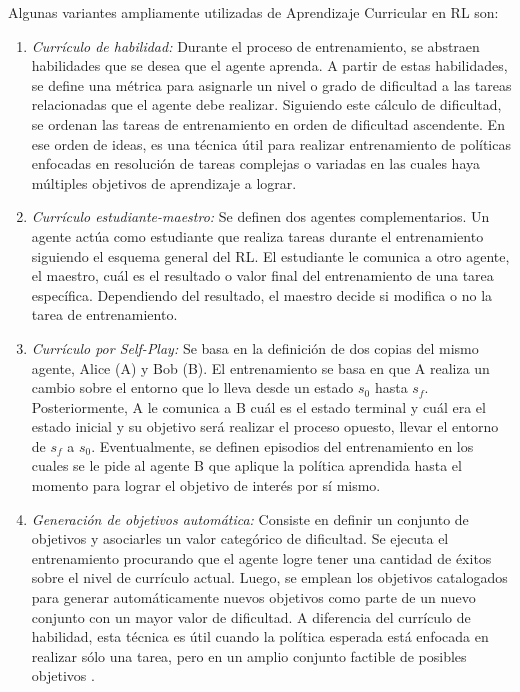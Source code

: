 Algunas variantes ampliamente utilizadas de Aprendizaje Curricular en RL son:

\begin{enumerate}
	\item \textit{Currículo de habilidad:} Durante el proceso de entrenamiento, se abstraen habilidades que se desea que el agente aprenda. A partir de estas habilidades, se define una métrica para asignarle un nivel o grado de dificultad a las tareas relacionadas que el agente debe realizar. Siguiendo este cálculo de dificultad, se ordenan las tareas de entrenamiento en orden de dificultad ascendente. En ese orden de ideas, es una técnica útil para realizar entrenamiento de políticas enfocadas en resolución de tareas complejas o variadas en las cuales haya múltiples objetivos de aprendizaje a lograr.
	
	\item \textit{Currículo estudiante-maestro:} Se definen dos agentes complementarios. Un agente actúa como estudiante que realiza tareas durante el entrenamiento siguiendo el esquema general del RL. El estudiante le comunica a otro agente, el maestro, cuál es el resultado o valor final del entrenamiento de una tarea específica. Dependiendo del resultado, el maestro decide si modifica o no la tarea de entrenamiento.
	
	\item \textit{Currículo por Self-Play:} Se basa en la definición de dos copias del mismo agente, Alice (A) y Bob (B). El entrenamiento se basa en que A realiza un cambio sobre el entorno que lo lleva desde un estado $s_0$ hasta $s_f$. Posteriormente, A le comunica a B cuál es el estado terminal y cuál era el estado inicial y su objetivo será realizar el proceso opuesto, llevar el entorno de $s_f$ a $s_0$. Eventualmente, se definen episodios del entrenamiento en los cuales se le pide al agente B que aplique la política aprendida hasta el momento para lograr el objetivo de interés por sí mismo.
	
	\item \textit{Generación de objetivos automática:} Consiste en definir un conjunto de objetivos y asociarles un valor categórico de dificultad. Se ejecuta el entrenamiento procurando que el agente logre tener una cantidad de éxitos sobre el nivel de currículo actual. Luego, se emplean los objetivos catalogados para generar automáticamente nuevos objetivos como parte de un nuevo conjunto con un mayor valor de dificultad. A diferencia del currículo de habilidad, esta técnica es útil cuando la política esperada está enfocada en realizar sólo una tarea, pero en un amplio conjunto factible de posibles objetivos \parencite{weng2020curriculum}.
\end{enumerate}


